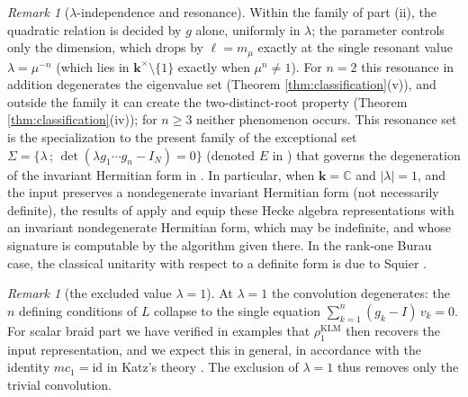 \documentclass[11pt]{article}
\theoremstyle{definition}
\theoremstyle{remark}
\newtheorem{remark}[theorem]{Remark}
\newcommand{\kk}{\boldsymbol{k}}
\begin{document}
\begin{remark}[$\lambda$-independence and resonance]\label{rem:lambda}
Within the family of part (ii), the quadratic relation is decided by
$g$ alone, uniformly in $\lambda$; the parameter controls only the
dimension, which drops by $\ell = m_{\mu}$ exactly at the single
resonant value $\lambda = \mu^{-n}$ (which lies in
$\kk^{\times}\setminus\{1\}$ exactly when $\mu^{n} \neq 1$). For
$n = 2$ this resonance in addition degenerates the eigenvalue set
(Theorem \ref{thm:classification}(v)), and outside the family it can
create the two-distinct-root property (Theorem
\ref{thm:classification}(iv)); for $n \geq 3$ neither phenomenon
occurs. This resonance set is the specialization to the present family
of the exceptional set
$\Sigma = \{\lambda\, ;\, \det(\lambda g_1 \cdots g_n - I_N) = 0\}$
(denoted $E$ in \cite{Negami25}) that
governs the degeneration of the invariant Hermitian form in
\cite{Negami25}. In particular, when $\kk = \mathbb{C}$ and
$|\lambda| = 1$, and the input preserves a nondegenerate invariant
Hermitian form (not necessarily definite), the results of
\cite[Section 5]{Negami25} apply and equip these Hecke algebra
representations with an invariant nondegenerate Hermitian form, which
may be indefinite, and whose signature is computable by the algorithm
given there. In the rank-one Burau case, the classical unitarity with
respect to a definite form is due to Squier \cite{Squier84}.
\end{remark}

\begin{remark}[the excluded value $\lambda = 1$]\label{rem:lambdaone}
At $\lambda = 1$ the convolution degenerates: the $n$ defining
conditions of $L$ collapse to the single equation
$\sum_{k=1}^{n} (g_k - I)\, v_k = 0$. For scalar braid part we have
verified in examples that $\rho^{\mathrm{KLM}}_{1}$ then recovers the
input representation, and we expect this in general, in accordance with
the identity $mc_1 = \mathrm{id}$ in Katz's theory
\cite{Katz96, DettweilerReiter00}. The exclusion of $\lambda = 1$ thus
removes only the trivial convolution.
\end{remark}
\end{document}
